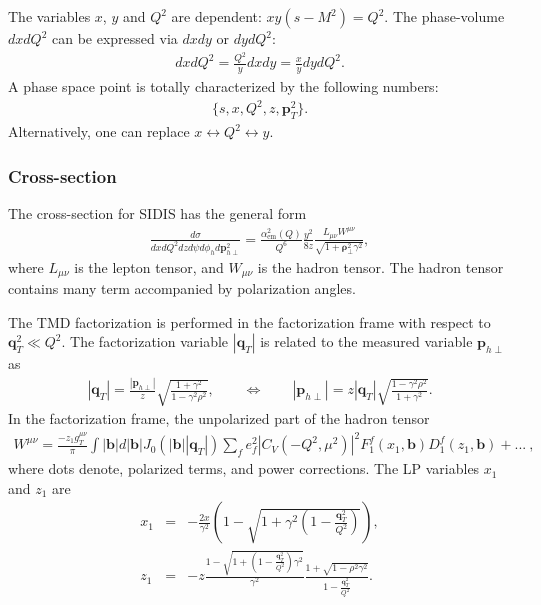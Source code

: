 \documentclass[prd,nofootinbib,eqsecnum,final]{revtex4}
\renewcommand{\(}{\left(}
\renewcommand{\)}{\right)}
\renewcommand{\[}{\left[}
\renewcommand{\]}{\right]}
\renewcommand{\vec}[1]{\bm{#1}}
\begin{document}
The variables $x$, $y$ and $Q^2$ are dependent: $xy(s-M^2)=Q^2$. The phase-volume $dxdQ^2$ can be expressed via $dxdy$ or $dydQ^2$:
\begin{eqnarray}
dxdQ^2= \frac{Q^2}{y}dxdy=\frac{x}{y}dydQ^2.
\end{eqnarray}
A phase space point is totally characterized by the following numbers:
\begin{eqnarray}
\{s,x,Q^2,z,\vec p_T^2\}.
\end{eqnarray}
Alternatively, one can replace $x\leftrightarrow Q^2 \leftrightarrow y$.

\subsubsection{Cross-section}

The cross-section for SIDIS has the general form
\begin{eqnarray}
\frac{d\sigma}{dx dQ^2 dzd\psi d\phi_h d \vec p^2_{h\perp}}=\frac{\alpha_{\text{em}}^2(Q)}{Q^6}\frac{y^2}{8z}\frac{L_{\mu\nu}W^{\mu\nu}}{\sqrt{1+\vec \rho^2_\perp \gamma^2}},
\end{eqnarray}
where $L_{\mu\nu}$ is the lepton tensor, and $W_{\mu\nu}$ is the hadron tensor. The hadron tensor contains many term accompanied by polarization angles. 

The TMD factorization is performed in the factorization frame with respect to $\vec q_T^2\ll Q^2$. The factorization variable $|\vec q_T|$ is related to the measured variable $\vec p_{h\perp}$ as
\begin{eqnarray}
|\vec q_T|=\frac{|\vec p_{h\perp}|}{z}\sqrt{\frac{1+\gamma^2}{1-\gamma^2\rho^2}},\qquad \Leftrightarrow \qquad |\vec p_{h\perp}|=z |\vec q_T|\sqrt{\frac{1-\gamma^2\rho^2}{1+\gamma^2}}.
\end{eqnarray}
In the factorization frame, the unpolarized part of the hadron tensor 
\begin{eqnarray}
W^{\mu\nu}=\frac{-z_1g_T^{\mu\nu}}{\pi}\int |\vec b| d |\vec b| J_0(|\vec b| |\vec q_T|)\sum_f e_f^2 |C_V(-Q^2,\mu^2)|^2 F_1^f(x_1,\vec b)D_1^f(z_1,\vec b)+...~,
\end{eqnarray}
where dots denote, polarized terms, and power corrections. The LP variables $x_1$ and $z_1$ are
\begin{eqnarray}
x_1&=&-\frac{2x}{\gamma^2}\(1-\sqrt{1+\gamma^2\(1-\frac{\vec q_T^2}{Q^2}\)}\),
\\
z_1&=&-z\frac{1-\sqrt{1+\(1-\frac{\vec q_T^2}{Q^2}\)\gamma^2}}{\gamma^2}\frac{1+\sqrt{1-\rho^2 \gamma^2}}{1-\frac{\vec q_T^2}{Q^2}}.
\end{eqnarray}
\end{document}
